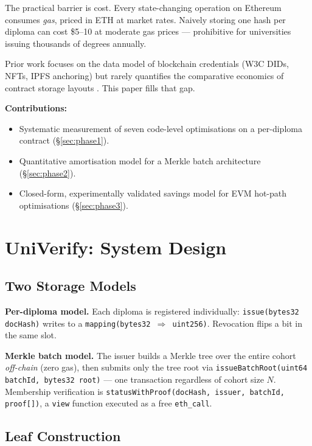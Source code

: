 \documentclass[conference]{IEEEtran}
\begin{document}
The practical barrier is cost.
Every state-changing operation on Ethereum consumes \emph{gas},
priced in ETH at market rates.
Naively storing one hash per diploma can cost \$5--10 at moderate
gas prices — prohibitive for universities issuing thousands
of degrees annually.

Prior work focuses on the data model of blockchain credentials
(W3C DIDs, NFTs, IPFS anchoring) but rarely quantifies
the comparative economics of contract storage layouts
\cite{alketbi2018blockchain,lizcano2020decentralised}.
This paper fills that gap.

\medskip\noindent\textbf{Contributions:}
\begin{itemize}
  \item Systematic measurement of seven code-level optimisations
        on a per-diploma contract (§\ref{sec:phase1}).
  \item Quantitative amortisation model for a Merkle batch
        architecture (§\ref{sec:phase2}).
  \item Closed-form, experimentally validated savings model
        for EVM hot-path optimisations (§\ref{sec:phase3}).
\end{itemize}

\section{UniVerify: System Design}
\label{sec:design}

\subsection{Two Storage Models}

\textbf{Per-diploma model.}
Each diploma is registered individually:
\texttt{issue(bytes32 docHash)} writes to a
\texttt{mapping(bytes32\,{\small$\Rightarrow$}\,uint256)}.
Revocation flips a bit in the same slot.

\textbf{Merkle batch model.}
The issuer builds a Merkle tree over the entire cohort \emph{off-chain}
(zero gas), then submits only the tree root via
\texttt{issueBatchRoot(uint64 batchId, bytes32 root)} —
one transaction regardless of cohort size $N$.
Membership verification is \texttt{statusWithProof(docHash, issuer, batchId, proof[])},
a \texttt{view} function executed as a free \texttt{eth\_call}.

\subsection{Leaf Construction}
\end{document}
